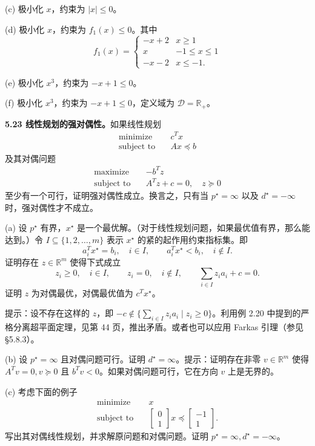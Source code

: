 \documentclass[UTF8,12pt,a4paper,fontset=fandol]{ctexart}
\begin{document}
(c) 极小化 $x$，约束为 $|x|\leq 0$。

(d) 极小化 $x$，约束为 $f_1(x)\leq 0$。其中
\[
f_1(x)=
\begin{cases}
-x+2 & x\geq 1\\
x & -1\leq x\leq 1\\
-x-2 & x\leq -1.
\end{cases}
\]

(e) 极小化 $x^3$，约束为 $-x+1\leq 0$。

(f) 极小化 $x^3$，约束为 $-x+1\leq 0$，定义域为 $\mathcal{D}=\mathbb{R}_+$。

\noindent\textbf{5.23 线性规划的强对偶性。}\quad 如果线性规划
\[
\begin{aligned}
\text{minimize}\quad & c^Tx\\
\text{subject to}\quad & Ax\preceq b
\end{aligned}
\]
及其对偶问题
\[
\begin{aligned}
\text{maximize}\quad & -b^Tz\\
\text{subject to}\quad & A^Tz+c=0,\quad z\succeq 0
\end{aligned}
\]
至少有一个可行，证明强对偶性成立。换言之，只有当 $p^\star=\infty$ 以及 $d^\star=-\infty$ 时，强对偶性才不成立。

(a) 设 $p^\star$ 有界，$x^\star$ 是一个最优解。（对于线性规划问题，如果最优值有界，那么能达到。）令 $I\subseteq\{1,2,\ldots,m\}$ 表示 $x^\star$ 的紧的起作用约束指标集。即
\[
a_i^Tx^\star=b_i,\quad i\in I,\qquad a_i^Tx^\star<b_i,\quad i\notin I.
\]
证明存在 $z\in\mathbb{R}^m$ 使得下式成立
\[
z_i\geq 0,\quad i\in I,\qquad z_i=0,\quad i\notin I,\qquad \sum_{i\in I}z_i a_i+c=0.
\]
证明 $z$ 为对偶最优，对偶最优值为 $c^Tx^\star$。

提示：设不存在这样的 $z$，即 $-c\notin\{\sum_{i\in I}z_i a_i\mid z_i\geq 0\}$。利用例 2.20 中提到的严格分离超平面定理，见第 44 页，推出矛盾。或者也可以应用 Farkas 引理（参见 §5.8.3）。

(b) 设 $p^\star=\infty$ 且对偶问题可行。证明 $d^\star=\infty$。提示：证明存在非零 $v\in\mathbb{R}^m$ 使得 $A^Tv=0, v\succeq 0$ 且 $b^Tv<0$。如果对偶问题可行，它在方向 $v$ 上是无界的。

(c) 考虑下面的例子
\[
\begin{aligned}
\text{minimize}\quad & x\\
\text{subject to}\quad &
\begin{bmatrix}
0\\
1
\end{bmatrix}x\preceq
\begin{bmatrix}
-1\\
1
\end{bmatrix}.
\end{aligned}
\]
写出其对偶线性规划，并求解原问题和对偶问题。证明 $p^\star=\infty, d^\star=-\infty$。
\end{document}
